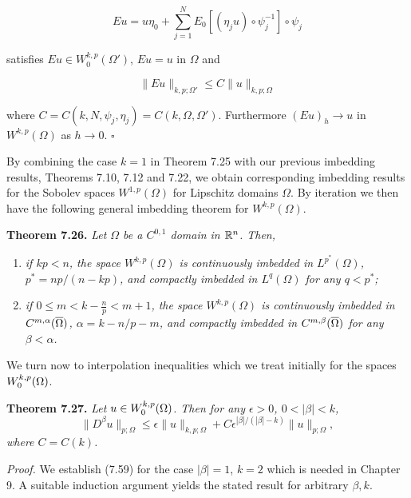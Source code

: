 \begin{equation}
Eu = u\eta_0 + \sum_{j=1}^{N} E_0[(\eta_j u) \circ \psi_j^{-1}] \circ \psi_j
\tag{7.58}
\end{equation}

satisfies $Eu \in W^{k,p}_0(\Omega')$, $Eu = u$ in $\Omega$ and

\[
\|Eu\|_{k,p;\Omega'} \leq C \|u\|_{k,p;\Omega}
\]

where $C = C(k,N,\psi_j,\eta_j) = C(k,\Omega,\Omega')$. Furthermore $(Eu)_h \to u$ in $W^{k,p}(\Omega)$ as $h \to 0$. \hfill $\square$

By combining the case $k = 1$ in Theorem 7.25 with our previous imbedding results, Theorems 7.10, 7.12 and 7.22, we obtain corresponding imbedding results for the Sobolev spaces $W^{1,p}(\Omega)$ for Lipschitz domains $\Omega$. By iteration we then have the following general imbedding theorem for $W^{k,p}(\Omega)$.

\medskip

\noindent\textbf{Theorem 7.26.} \textit{Let $\Omega$ be a $C^{0,1}$ domain in $\mathbb{R}^n$. Then,}
\begin{enumerate}
\item[(i)] \textit{if $kp < n$, the space $W^{k,p}(\Omega)$ is continuously imbedded in $L^{p^*}(\Omega)$, $p^* = np/(n - kp)$, and compactly imbedded in $L^q(\Omega)$ for any $q < p^*$;}
\item[(ii)] \textit{if $0 \le m < k - \frac{n}{p} < m + 1$, the space $W^{k,p}(\Omega)$ is continuously imbedded in $C^{m,\alpha}(\overline{\Omega})$, $\alpha = k - n/p - m$, and compactly imbedded in $C^{m,\beta}(\overline{\Omega})$ for any $\beta < \alpha$.}
\end{enumerate}

We turn now to interpolation inequalities which we treat initially for the spaces $W^{k,p}_0(\Omega)$.

\medskip

\noindent\textbf{Theorem 7.27.} \textit{Let $u \in W^{k,p}_0(\Omega)$. Then for any $\epsilon > 0$, $0 < |\beta| < k$,}
\begin{equation}
\|D^\beta u\|_{p;\Omega} \le \epsilon \|u\|_{k,p;\Omega} + C \epsilon^{|\beta|/(|\beta|-k)} \|u\|_{p;\Omega},
\tag{7.59}
\end{equation}
\textit{where $C = C(k)$.}

\textit{Proof.} We establish (7.59) for the case $|\beta| = 1$, $k = 2$ which is needed in Chapter 9. A suitable induction argument yields the stated result for arbitrary $\beta, k$.

